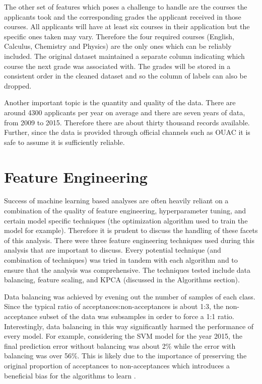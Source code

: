 The other set of features which poses a challenge to handle are the courses the applicants took and the corresponding grades the applicant received in those courses. All applicants will have at least six courses in their application but the specific ones taken may vary. Therefore the four required courses (English, Calculus, Chemistry and Physics) are the only ones which can be reliably included. The original dataset maintained a separate column indicating which course the next grade was associated with. The grades will be stored in a consistent order in the cleaned dataset and so the column of labels can also be dropped.

Another important topic is the quantity and quality of the data. There are around 4300 applicants per year on average and there are seven years of data, from 2009 to 2015. Therefore there are about thirty thousand records available. Further, since the data is provided through official channels such as OUAC it is safe to assume it is sufficiently reliable.



\section{Feature Engineering}
Success of machine learning based analyses are often heavily reliant on a combination of the quality of feature engineering, hyperparameter tuning, and certain model specific techniques (the optimization algorithm used to train the model for example). Therefore it is prudent to discuss the handling of these facets of this analysis. There were three feature engineering techniques used during this analysis that are important to discuss. Every potential technique (and combination of techniques) was tried in tandem with each algorithm and to ensure that the analysis was comprehensive. The techniques tested include data balancing, feature scaling, and KPCA (discussed in the Algorithms section).

Data balancing was achieved by evening out the number of samples of each class. Since the typical ratio of acceptances:non-acceptances is about 1:3, the non-acceptance subset of the data was subsamples in order to force a 1:1 ratio. Interestingly, data balancing in this way significantly harmed the performance of every model. For example, considering the SVM model for the year 2015, the final prediction error without balancing was about 2\% while the error with balancing was over 56\%. This is likely due to the importance of preserving the original proportion of acceptances to non-acceptances which introduces a beneficial bias for the algorithms to learn \cite{imbalanceBias}.

